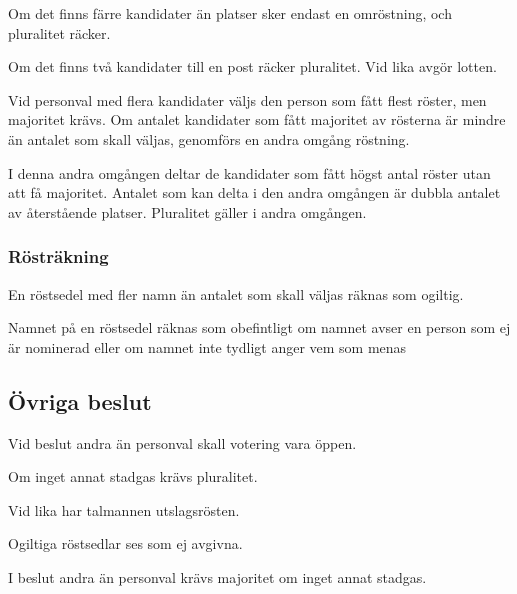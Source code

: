 \documentclass{dsekprotokoll}
\begin{document}
Om det finns färre kandidater än platser sker endast en omröstning, och pluralitet räcker.


Om det finns två kandidater till en post räcker pluralitet. Vid lika avgör lotten.


Vid personval med flera kandidater väljs den person som fått flest röster, men majoritet krävs.
Om antalet kandidater som fått majoritet av rösterna är mindre än antalet som skall väljas,
genomförs en andra omgång röstning.


I denna andra omgången deltar de kandidater som fått högst antal röster utan att få majoritet.
Antalet som kan delta i den andra omgången är dubbla antalet av återstående platser. Pluralitet
gäller i andra omgången.

\subsubsection{Rösträkning}
En röstsedel med fler namn än antalet som skall väljas räknas som ogiltig.


Namnet på en röstsedel räknas som obefintligt om namnet avser en person som ej är nominerad
eller om namnet inte tydligt anger vem som menas

\subsection{Övriga beslut}
Vid beslut andra än personval skall votering vara öppen.

Om inget annat stadgas krävs pluralitet.

Vid lika har talmannen utslagsrösten.

Ogiltiga röstsedlar ses som ej avgivna.

I beslut andra än personval krävs majoritet om inget annat stadgas.
\end{document}
